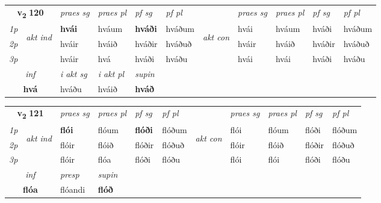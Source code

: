 \noindent
\begin{tabular}{lllllllllll} \toprule
\multicolumn{2}{c}{\textbf{v{\textsubscript{2}}} \Large{\textbf{120}}}  &  \textit{praes sg}  & \textit{praes pl}  &\textit{ pf sg} & \textit{pf pl} &  &  \textit{praes sg}  & \textit{praes pl}  & \textit{pf sg} & \textit{pf pl } \\*
	\cmidrule{3-6} \cmidrule{8-11}
 {\textit{1p}} & \multirow{3}{*}{\begin{turn}{90}\textit{akt ind}\end{turn}} & \textbf{hvái} & hváum & \textbf{hváði} & hváðum & \multirow{3}{*}{\begin{turn}{90}\textit{akt con}\end{turn}} &hvái & hváum & hváði & hváðum\\*
 {\textit{2p}} &  &  hváir  & hváið & hváðir & hváðuð & & hváir & hváið & hváðir & hváðuð \\*
{\textit{3p}} &  & hváir & hvá & hváði & hváðu & & hvái & hvái& hváði & hváðu \\*
\cmidrule{3-6} \cmidrule{8-11}

   \multicolumn{2}{c}{\textit{inf}}  & \textit{i akt sg} & \textit{i akt pl}    & \textit{supin}   \\*
  \multicolumn{2}{c}{\textbf{hvá}} & hváðu  & hváið    &  \textbf{hváð}   \\*
\end{tabular}

\noindent
\begin{tabular}{lllllllllll} \toprule
\multicolumn{2}{c}{\textbf{v{\textsubscript{2}}} \Large{\textbf{121}}}  &  \textit{praes sg}  & \textit{praes pl}  &\textit{ pf sg} & \textit{pf pl} &  &  \textit{praes sg}  & \textit{praes pl}  & \textit{pf sg} & \textit{pf pl } \\*
	\cmidrule{3-6} \cmidrule{8-11}
 {\textit{1p}} & \multirow{3}{*}{\begin{turn}{90}\textit{akt ind}\end{turn}} & \textbf{flói} & flóum & \textbf{flóði} & flóðum & \multirow{3}{*}{\begin{turn}{90}\textit{akt con}\end{turn}} &flói & flóum & flóði & flóðum\\*
 {\textit{2p}} &  &  flóir  & flóið & flóðir & flóðuð & & flóir & flóið & flóðir & flóðuð \\*
{\textit{3p}} &  & flóir & flóa & flóði & flóðu & & flói & flói& flóði & flóðu \\*
\cmidrule{3-6} \cmidrule{8-11}

   \multicolumn{2}{c}{\textit{inf}}     & \textit{presp} & \textit{supin}   \\*
  \multicolumn{2}{c}{\textbf{flóa}}      & flóandi &  \textbf{flóð}   \\*
\end{tabular}

